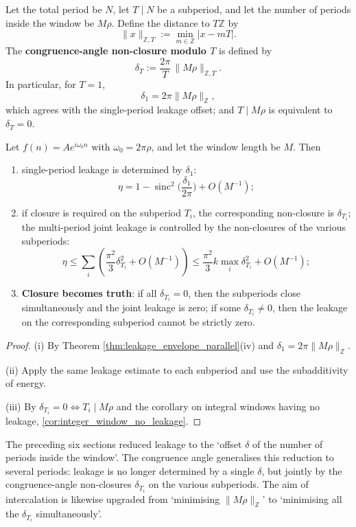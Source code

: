 \begin{definition}\label{def:congruence_angle_misclosure}
Let the total period be $N$, let $T\mid N$ be a subperiod, and let the number of periods inside the window be $M\rho$. Define the distance to $T\mathbb{Z}$ by
\[
\|x\|_{\mathbb{Z},T}:=\min_{m\in\mathbb{Z}}|x-mT|.
\]
The \textbf{congruence-angle non-closure modulo $T$} is defined by
\[
\delta_T:=\frac{2\pi}{T}\,\|M\rho\|_{\mathbb{Z},T}.
\]
In particular, for $T=1$,
\[
\delta_1=2\pi\|M\rho\|_{\mathbb{Z}},
\]
which agrees with the single-period leakage offset; and $T\mid M\rho$ is equivalent to $\delta_T=0$.
\end{definition}

\begin{theorem}\label{thm:congruence_angle_leakage}
Let $f(n)=Ae^{i\omega_0 n}$ with $\omega_0=2\pi\rho$, and let the window length be $M$. Then
\begin{enumerate}[label=(\roman*)]
    \item single-period leakage is determined by $\delta_1$:
    \[
    \eta=1-\operatorname{sinc}^2\!\Big(\frac{\delta_1}{2\pi}\Big)+O(M^{-1});
    \]
    \item if closure is required on the subperiod $T_i$, the corresponding non-closure is $\delta_{T_i}$; the multi-period joint leakage is controlled by the non-closures of the various subperiods:
    \[
    \eta\le\sum_i\left(\frac{\pi^2}{3}\delta_{T_i}^2+O(M^{-1})\right)
    \le \frac{\pi^2}{3}k\max_i\delta_{T_i}^2+O(M^{-1});
    \]
    \item \textbf{Closure becomes truth}: if all $\delta_{T_i}=0$, then the subperiods close simultaneously and the joint leakage is zero; if some $\delta_{T_i}\ne0$, then the leakage on the corresponding subperiod cannot be strictly zero.
\end{enumerate}
\end{theorem}

\begin{proof}
(i) By Theorem \ref{thm:leakage_envelope_parallel}(iv) and $\delta_1=2\pi\|M\rho\|_{\mathbb{Z}}$.

(ii) Apply the same leakage estimate to each subperiod and use the subadditivity of energy.

(iii) By $\delta_{T_i}=0\iff T_i\mid M\rho$ and the corollary on integral windows having no leakage, \ref{cor:integer_window_no_leakage}.
\end{proof}

\begin{remark}\label{rem:congruence_angle_unified_leakage}
The preceding six sections reduced leakage to the `offset $\delta$ of the number of periods inside the window'. The congruence angle generalises this reduction to several periods: leakage is no longer determined by a single $\delta$, but jointly by the congruence-angle non-closures $\delta_{T_i}$ on the various subperiods. The aim of intercalation is likewise upgraded from `minimising $\|M\rho\|_{\mathbb{Z}}$' to `minimising all the $\delta_{T_i}$ simultaneously'.
\end{remark}

